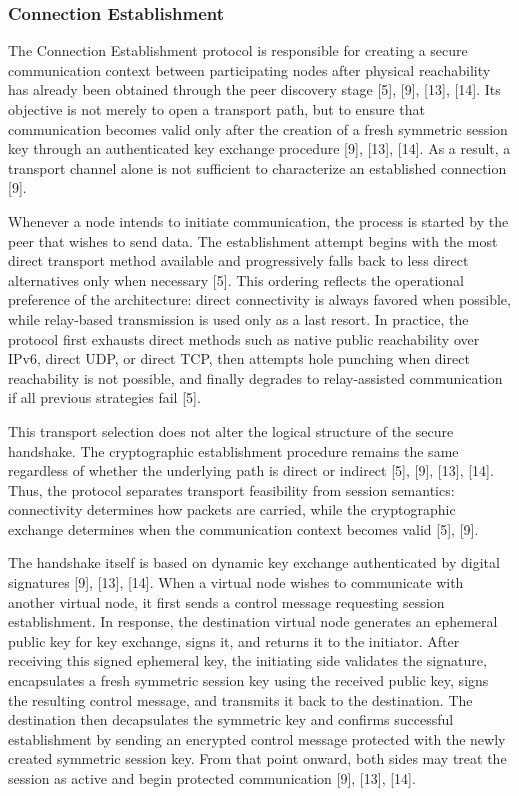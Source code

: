 \documentclass[12pt,a4paper]{article}
\begin{document}
\subsubsection{Connection Establishment}

The Connection Establishment protocol is responsible for creating a secure communication context between participating nodes after physical reachability has already been obtained through the peer discovery stage [5], [9], [13], [14]. Its objective is not merely to open a transport path, but to ensure that communication becomes valid only after the creation of a fresh symmetric session key through an authenticated key exchange procedure [9], [13], [14]. As a result, a transport channel alone is not sufficient to characterize an established connection [9].

Whenever a node intends to initiate communication, the process is started by the peer that wishes to send data. The establishment attempt begins with the most direct transport method available and progressively falls back to less direct alternatives only when necessary [5]. This ordering reflects the operational preference of the architecture: direct connectivity is always favored when possible, while relay-based transmission is used only as a last resort. In practice, the protocol first exhausts direct methods such as native public reachability over IPv6, direct UDP, or direct TCP, then attempts hole punching when direct reachability is not possible, and finally degrades to relay-assisted communication if all previous strategies fail [5].

This transport selection does not alter the logical structure of the secure handshake. The cryptographic establishment procedure remains the same regardless of whether the underlying path is direct or indirect [5], [9], [13], [14]. Thus, the protocol separates transport feasibility from session semantics: connectivity determines how packets are carried, while the cryptographic exchange determines when the communication context becomes valid [5], [9].

The handshake itself is based on dynamic key exchange authenticated by digital signatures [9], [13], [14]. When a virtual node wishes to communicate with another virtual node, it first sends a control message requesting session establishment. In response, the destination virtual node generates an ephemeral public key for key exchange, signs it, and returns it to the initiator. After receiving this signed ephemeral key, the initiating side validates the signature, encapsulates a fresh symmetric session key using the received public key, signs the resulting control message, and transmits it back to the destination. The destination then decapsulates the symmetric key and confirms successful establishment by sending an encrypted control message protected with the newly created symmetric session key. From that point onward, both sides may treat the session as active and begin protected communication [9], [13], [14].
\end{document}
